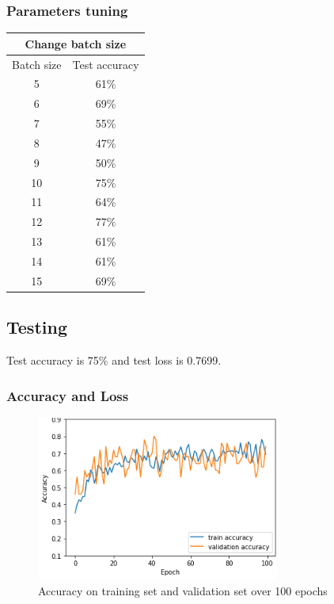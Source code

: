 \documentclass[a4paper,10pt]{article}
\begin{document}
\subsubsection{Parameters tuning}

\begin{tabular}{|c|c|}
  
  \hline
  \multicolumn{2}{|c|}{Change batch size} \\
  \hline
  Batch size      & Test accuracy \\
  \hline
  5     & 61\%  \\
  6     & 69\%  \\
  7     & 55\%  \\
  8     & 47\%  \\
  9     & 50\%  \\
  10    & 75\%  \\
  11    & 64\%  \\
  12    & 77\%  \\
  13    & 61\%  \\
  14    & 61\%  \\
  15    & 69\%  \\
  \hline
\end{tabular}



\subsection{Testing}
Test accuracy is 75\% and test loss is 0.7699.
\subsubsection{Accuracy and Loss}
\begin{figure}[H]
  \centering
  \includegraphics[width=8cm]{./images/task2-accuracy.png}
     \caption{Accuracy on training set and validation set over 100 epochs}
        \label{task2-accuracy}
\end{figure}
\end{document}
